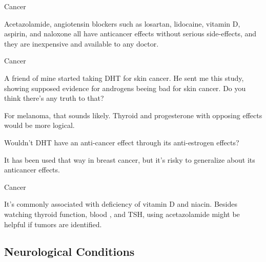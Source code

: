 \documentclass[11pt,oneside,openany,extrafontsizes]{memoir}
\begin{document}
\begin{standalonequote}{Cancer}

    \begin{answer}
      Acetazolamide, angiotensin blockers such as losartan, lidocaine, vitamin D, aspirin, and naloxone all have anticancer effects without serious side-effects, and they are inexpensive and available to any doctor.
    \end{answer}
\end{standalonequote}

\begin{emailexchange}{Cancer}

    \begin{question}
        A friend of mine started taking DHT for skin cancer. He sent me this study, showing supposed evidence for androgens beeing bad for skin cancer. Do you think there's any truth to that? 
    \end{question}

    \begin{answer}
      For melanoma, that sounds likely. Thyroid and progesterone with opposing effects would be more logical.
    \end{answer}

    \begin{question}
        Wouldn't DHT have an anti-cancer effect through its anti-estrogen effects?
    \end{question}

    \begin{answer}
      It has been used that way in breast cancer, but it's risky to generalize about its anticancer effects.
    \end{answer}
\end{emailexchange}

\begin{standalonequote}{Cancer}

    \begin{answer}
      It's commonly associated with deficiency of vitamin D and niacin. Besides watching thyroid function, blood , and TSH, using acetazolamide might be helpful if tumors are identified.
    \end{answer}
\end{standalonequote}

\subsection{Neurological Conditions}
\end{document}
